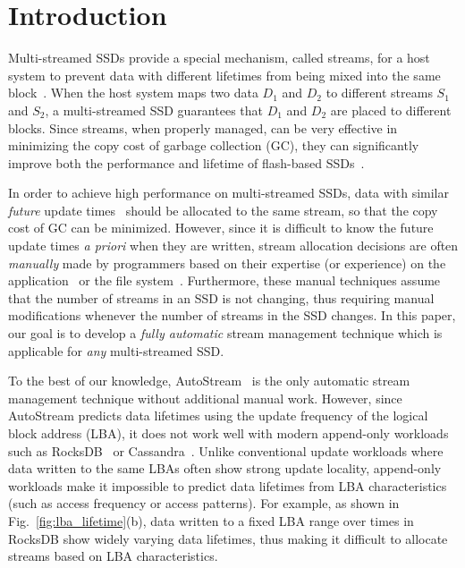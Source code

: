 \vspace{-10pt}
\section{Introduction}
\label{sec:intro}
\vspace{-3pt}
Multi-streamed SSDs provide a special mechanism,
called streams, for a host system to prevent data with different lifetimes 
from being mixed into the same block~\cite{T10, MultiStream}.
When the host system maps two data $D_1$ and $D_2$ to 
different streams $S_1$ and $S_2$, a multi-streamed SSD guarantees that 
$D_1$ and $D_2$ are placed to different blocks.   
Since streams, when properly managed, can be very effective in minimizing 
the copy cost of garbage collection (GC), they
can significantly improve both the performance and lifetime of 
flash-based SSDs~\cite{MultiStream, Level, FStream, AutoStream}.

In order to achieve high performance on multi-streamed SSDs, data with similar 
{\it future} update times~\cite{PCHa}
should be allocated 
to the same stream, so that the copy cost of GC can be minimized.
However, since it is difficult to know the future update times {\it a priori} when they are written,
stream allocation decisions are often {\it manually} made 
by programmers based on their expertise (or experience) 
on the application~\cite{MultiStream, Level} or the file system~\cite{FStream}.  
Furthermore, these manual techniques assume 
that the number of streams in an SSD is not changing, 
thus requiring manual modifications whenever the number of streams in the SSD changes.
In this paper, our goal is to develop 
a {\it fully automatic} stream management technique which is applicable for {\it any} multi-streamed SSD. %

To the best of our knowledge, \textsf{\small AutoStream}~\cite{AutoStream} is the only automatic 
stream management technique
without additional manual work.  
However, since \textsf{\small AutoStream} predicts data lifetimes using the update frequency 
of the logical block address (LBA), it does not work well with modern append-only workloads 
such as RocksDB~\cite{RocksDB} or Cassandra~\cite{Cassandra}.  
Unlike conventional update workloads where data written to the same LBAs 
often show strong update locality, 
append-only workloads make it impossible to predict data lifetimes 
from LBA characteristics (such as access frequency or access patterns).  
For example, as shown in Fig.~\ref{fig:lba_lifetime}(b), 
data written to a fixed LBA range over times in RocksDB 
show widely varying data lifetimes, 
thus making it difficult to allocate streams based on LBA characteristics.

